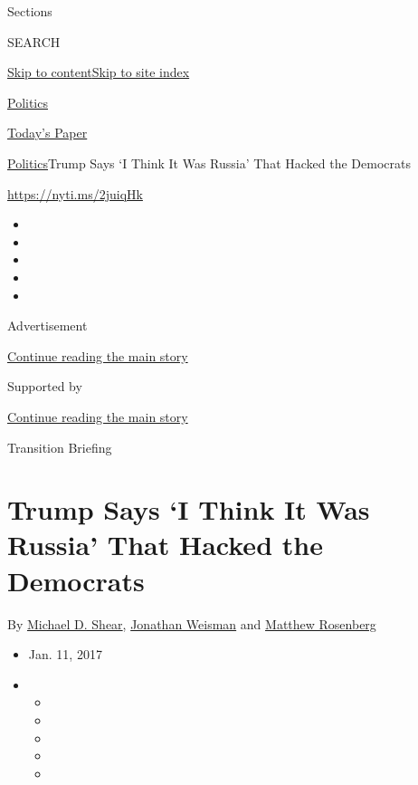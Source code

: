 Sections

SEARCH

\protect\hyperlink{site-content}{Skip to
content}\protect\hyperlink{site-index}{Skip to site index}

\href{https://www.nytimes.com/section/politics}{Politics}

\href{https://myaccount.nytimes.com/auth/login?response_type=cookie\&client_id=vi}{}

\href{https://www.nytimes.com/section/todayspaper}{Today's Paper}

\href{/section/politics}{Politics}\textbar{}Trump Says `I Think It Was
Russia' That Hacked the Democrats

\url{https://nyti.ms/2juiqHk}

\begin{itemize}
\item
\item
\item
\item
\item
\end{itemize}

Advertisement

\protect\hyperlink{after-top}{Continue reading the main story}

Supported by

\protect\hyperlink{after-sponsor}{Continue reading the main story}

Transition Briefing

\hypertarget{trump-says-i-think-it-was-russia-that-hacked-the-democrats}{%
\section{Trump Says `I Think It Was Russia' That Hacked the
Democrats}\label{trump-says-i-think-it-was-russia-that-hacked-the-democrats}}

By \href{http://www.nytimes.com/by/michael-d-shear}{Michael D. Shear},
\href{http://www.nytimes.com/by/jonathan-weisman}{Jonathan Weisman} and
\href{http://www.nytimes.com/by/matthew-rosenberg}{Matthew Rosenberg}

\begin{itemize}
\item
  Jan. 11, 2017
\item
  \begin{itemize}
  \item
  \item
  \item
  \item
  \item
  \end{itemize}
\end{itemize}

